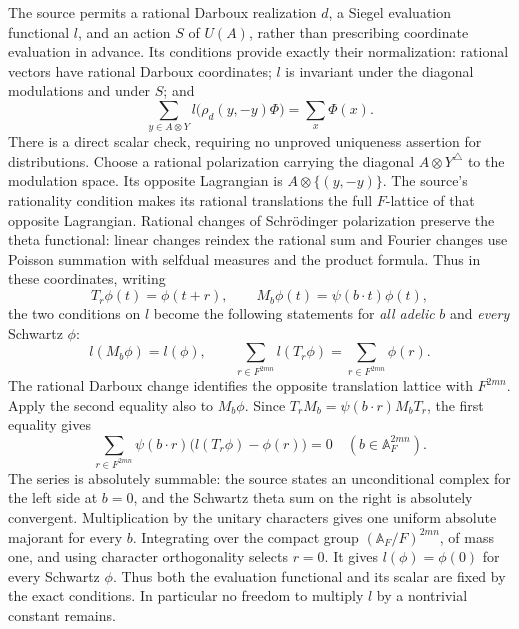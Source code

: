 The source permits a rational Darboux realization \(d\), a
Siegel evaluation functional \(l\), and an action \(S\) of
\(U(A)\), rather than prescribing coordinate evaluation
in advance.
Its  conditions provide exactly their
normalization: rational vectors have rational Darboux
coordinates; \(l\) is invariant under the diagonal
modulations and under \(S\); and
\[
 \sum_{y\in A\otimes Y}
      l\bigl(\rho_d(y,-y)\Phi\bigr)
                               =\sum_x\Phi(x).
\]
There is a direct scalar check, requiring no unproved
uniqueness assertion for distributions.
Choose a rational polarization carrying the diagonal
\(A\otimes Y^\triangle\) to the modulation space.
Its opposite Lagrangian is \(A\otimes\{(y,-y)\}\).
The source's rationality condition makes its rational
translations the full \(F\)-lattice of that opposite
Lagrangian.  Rational changes of Schr\"odinger polarization
preserve the theta functional: linear changes reindex the
rational sum and Fourier changes use Poisson summation
with selfdual measures and the product formula.
Thus in these coordinates, writing
\[
 T_r\phi(t)=\phi(t+r),\qquad
 M_b\phi(t)=\psi(b\cdot t)\phi(t),
\]
the two conditions on \(l\) become the following statements
for \emph{all adelic} \(b\) and \emph{every} Schwartz \(\phi\):
\[
 l(M_b\phi)=l(\phi),\qquad
       \sum_{r\in F^{2mn}}l(T_r\phi)
                         =\sum_{r\in F^{2mn}}\phi(r).
\]
The rational Darboux change identifies the opposite
translation lattice with \(F^{2mn}\).
Apply the second equality also to \(M_b\phi\).
Since \(T_rM_b=\psi(b\cdot r)M_bT_r\), the first equality
gives
\[
 \sum_{r\in F^{2mn}}\psi(b\cdot r)
                 \bigl(l(T_r\phi)-\phi(r)\bigr)=0
                                     \quad(b\in\mathbb A_F^{2mn}).
\]
The series is absolutely summable: the source states an
unconditional complex  for the left side at
\(b=0\), and the Schwartz theta sum on the right is
absolutely convergent.
Multiplication by the unitary characters gives one uniform
absolute majorant for every \(b\).
Integrating over the compact group
\((\mathbb A_F/F)^{2mn}\), of mass one, and using character
orthogonality selects \(r=0\).
It gives \(l(\phi)=\phi(0)\) for every Schwartz \(\phi\).
Thus both the evaluation functional and its scalar are
fixed by the exact  conditions.
In particular no freedom to multiply \(l\) by a nontrivial
constant remains.


